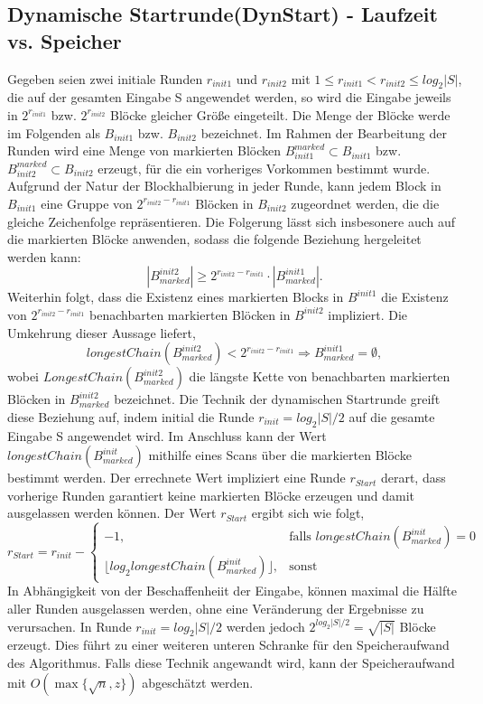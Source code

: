 \subsection{Dynamische Startrunde(DynStart) - Laufzeit vs. Speicher} \label{sec:dynstart}
Gegeben seien zwei initiale Runden $r_{init1}$ und $r_{init2}$ mit $1\leq r_{init1} < r_{init2}\leq log_2{|S|}$, die auf der gesamten Eingabe S angewendet werden, 
so wird die Eingabe jeweils in $2^{r_{init1}}$ bzw. $2^{r_{init2}}$ Blöcke gleicher Größe eingeteilt. Die Menge der Blöcke werde im Folgenden als $B_{init1}$ bzw. $B_{init2}$ bezeichnet.
Im Rahmen der Bearbeitung der Runden wird eine Menge von markierten Blöcken $B_{init1}^{marked}\subset B_{init1}$ bzw. $B_{init2}^{marked}\subset B_{init2}$ erzeugt, für die ein vorheriges
Vorkommen bestimmt wurde. Aufgrund der Natur der Blockhalbierung in jeder Runde, kann jedem Block in $B_{init1}$ eine Gruppe von $2^{r_{init2}-r_{init1}}$ Blöcken in $B_{init2}$ zugeordnet
werden, die die gleiche Zeichenfolge repräsentieren. Die Folgerung lässt sich insbesonere auch auf die markierten Blöcke anwenden, sodass die folgende Beziehung hergeleitet werden kann:
\begin{equation}
    |B^{init2}_{marked}| \geq 2^{r_{init2}-r_{init1}} \cdot |B^{init1}_{marked}|.
\end{equation}
Weiterhin folgt, dass die Existenz eines markierten Blocks in $B^{init1}$ die Existenz von $2^{r_{init2}-r_{init1}}$ benachbarten markierten Blöcken in $B^{init2}$ impliziert. Die
Umkehrung dieser Aussage liefert,
\begin{equation}
    longestChain(B^{init2}_{marked}) < 2^{r_{init2}-r_{init1}} \Rightarrow B^{init1}_{marked}=\emptyset, 
\end{equation}
wobei $LongestChain(B^{init2}_{marked})$ die längste Kette von benachbarten markierten Blöcken in $B^{init2}_{marked}$ bezeichnet.
Die Technik der dynamischen Startrunde greift diese Beziehung auf, indem initial die Runde $r_{init}=log_2{|S|}/2$ auf die gesamte Eingabe S angewendet wird. Im Anschluss
kann der Wert $longestChain(B^{init}_{marked})$ mithilfe eines Scans über die markierten Blöcke bestimmt werden. Der errechnete Wert impliziert eine Runde $r_{Start}$ derart,
dass vorherige Runden garantiert keine markierten Blöcke erzeugen und damit ausgelassen werden können. Der Wert $r_{Start}$ ergibt sich wie folgt,
\begin{equation}
    r_{Start} = r_{init}-
    \begin{cases}
        -1, & \text{falls } longestChain(B^{init}_{marked}) = 0\\
        \lfloor log_2{longestChain(B^{init}_{marked})} \rfloor, & \text{sonst}
    \end{cases}
\end{equation}
In Abhängigkeit von der Beschaffenheiit der Eingabe, können maximal die Hälfte aller Runden ausgelassen werden, ohne eine Veränderung der Ergebnisse zu verursachen. In
Runde $r_{init}=log_2{|S|}/2$ werden jedoch $2^{log_2{|S|}/2}=\sqrt{|S|}$ Blöcke erzeugt. Dies führt zu einer weiteren unteren Schranke für den Speicheraufwand des Algorithmus.
Falls diese Technik angewandt wird, kann der Speicheraufwand mit $O(\max\{\sqrt{n}, z\})$ abgeschätzt werden.

